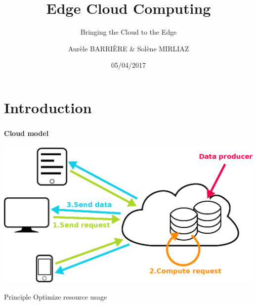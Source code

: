 \documentclass[utf8,xcolor=table, page number]{earlywinter}
\begin{document}
\title{Edge Cloud Computing}
\subtitle{Bringing the Cloud to the Edge}
\author{Aurèle BARRIÈRE & Solène MIRLIAZ}
\date{05/04/2017}

\begin{frame}[plain]
  \titlepage%
\end{frame}

\section*{Introduction}
\begin{frame}
	\frametitle{\secname}
  \framesubtitle{Cloud model}
  \begin{center}
    \includegraphics[width=0.7\linewidth]{cloud.eps}
  \end{center}
  \begin{block}{Principle}
    Optimize resource usage
  \end{block}
\end{frame}
\end{document}
